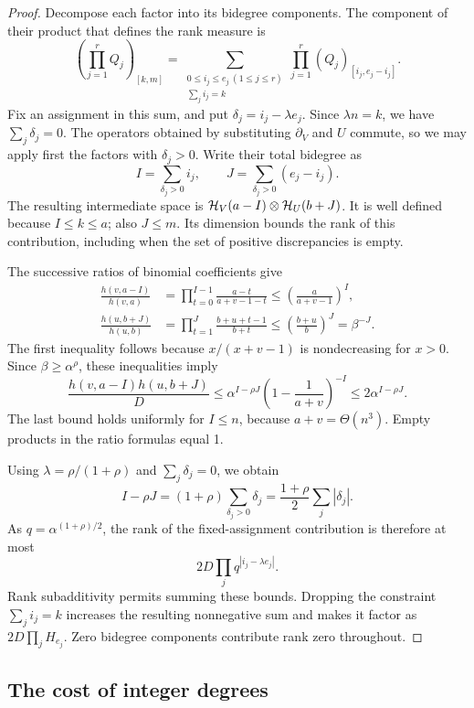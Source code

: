 \begin{proof}
Decompose each factor into its bidegree components.  The component of
their product that defines the rank measure is
\[
 \left(\prod_{j=1}^r Q_j\right)_{[k,m]}
 =\sum_{\substack{0\le i_j\le e_j\ (1\le j\le r)\\
                   \sum_j i_j=k}}
   \prod_{j=1}^r (Q_j)_{[i_j,e_j-i_j]}.
\]
Fix an assignment in this sum, and put
$\delta_j=i_j-\lambda e_j$.  Since $\lambda n=k$, we have
$\sum_j\delta_j=0$.  The operators obtained by substituting
$\partial_V$ and $U$ commute, so we may apply first the factors with
$\delta_j>0$.  Write their total bidegree as
\[
 I=\sum_{\delta_j>0}i_j,
 \qquad J=\sum_{\delta_j>0}(e_j-i_j).
\]
The resulting intermediate space is
$\mathcal H_V(a-I)\otimes\mathcal H_U(b+J)$.  It is well defined because
$I\le k\le a$; also $J\le m$.  Its dimension bounds the rank of this
contribution, including when the set of positive discrepancies is
empty.

The successive ratios of binomial coefficients give
\begin{align*}
 \frac{h(v,a-I)}{h(v,a)}
 &=\prod_{t=0}^{I-1}\frac{a-t}{a+v-1-t}
 \le\left(\frac{a}{a+v-1}\right)^I,\\
 \frac{h(u,b+J)}{h(u,b)}
 &=\prod_{t=1}^{J}\frac{b+u+t-1}{b+t}
 \le\left(\frac{b+u}{b}\right)^J
 =\beta^{-J}.
\end{align*}
The first inequality follows because $x/(x+v-1)$ is nondecreasing for
$x>0$.  Since $\beta\ge\alpha^\rho$, these inequalities imply
\begin{equation}
\label{eq:intermediate-dimension}
 \frac{h(v,a-I)h(u,b+J)}{D}
 \le \alpha^{I-\rho J}
       \left(1-\frac1{a+v}\right)^{-I}
 \le 2\alpha^{I-\rho J}.
\end{equation}
The last bound holds uniformly for $I\le n$, because
$a+v=\Theta(n^3)$.  Empty products in the ratio formulas equal 1.

Using $\lambda=\rho/(1+\rho)$ and $\sum_j\delta_j=0$, we obtain
\[
 I-\rho J
 =(1+\rho)\sum_{\delta_j>0}\delta_j
 =\frac{1+\rho}{2}\sum_j|\delta_j|.
\]
As $q=\alpha^{(1+\rho)/2}$, the rank of the fixed-assignment
contribution is therefore at most
\[
 2D\prod_j q^{|i_j-\lambda e_j|}.
\]
Rank subadditivity permits summing these bounds.  Dropping the
constraint $\sum_j i_j=k$ increases the resulting nonnegative sum
and makes it factor as $2D\prod_jH_{e_j}$.  Zero bidegree components
contribute rank zero throughout.
\end{proof}

\subsection{The cost of integer degrees}

